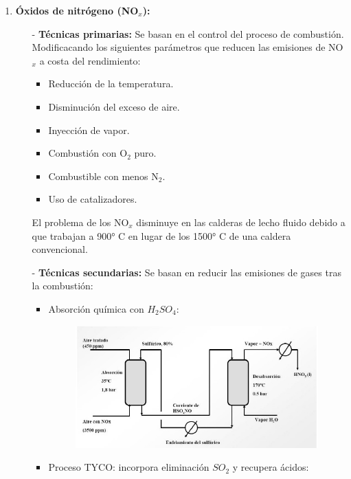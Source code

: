 \begin{enumerate}
\begin{enumerate}
	\end{enumerate}
	\item \textbf{Óxidos de nitrógeno (NO$_x$):}
	\begin{itemize}
		\item [-] \textbf{Técnicas primarias:} Se basan en el control del proceso de combustión. Modificacando los siguientes parámetros que reducen las emisiones de NO$_x$ a costa del rendimiento:
		\begin{itemize}
			\item Reducción de la temperatura.
			\item Disminución del exceso de aire.
			\item Inyección de vapor.
			\item Combustión con O$_2$ puro.
			\item Combustible con menos N$_2$.
			\item Uso de catalizadores.
		\end{itemize}
		El problema de los NO$_x$ disminuye en las calderas de lecho fluido debido a que trabajan a 900° C en lugar de los 1500° C de una caldera convencional.
		\item [-] \textbf{Técnicas secundarias:} Se basan en reducir las emisiones de gases tras la combustión:
		\begin{itemize}
			\item Absorción química con $H_2SO_4$:
			
\begin{figure}[H]
	\centering
	\includegraphics[width=0.5\linewidth]{res/tema2/H2so4abs}
	\label{fig:h2so4abs}
\end{figure}
	\item Proceso TYCO: incorpora eliminación $SO_2$ y recupera ácidos:
	

\end{itemize}
\end{itemize}
\end{enumerate}
